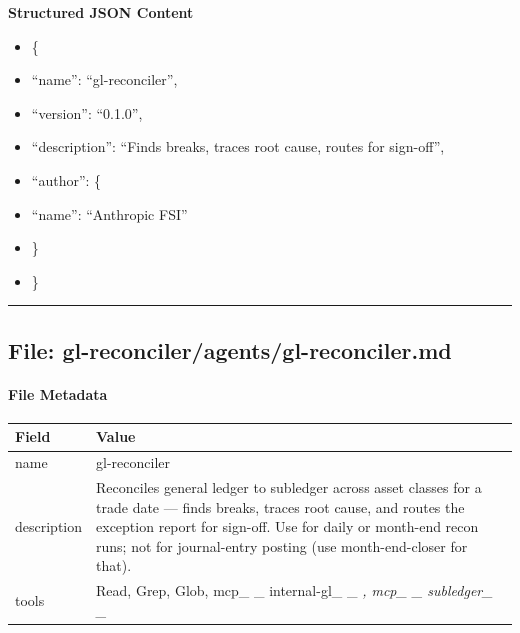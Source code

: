 \documentclass[11pt]{article}
\begin{document}
\textbf{Structured JSON Content}
\begin{itemize}[leftmargin=*,itemsep=2pt,topsep=2pt]
\item {} \{
\item {} ``name'': ``gl-reconciler'',
\item {} ``version'': ``0.1.0'',
\item {} ``description'': ``Finds breaks, traces root cause, routes for sign-off'',
\item {} ``author'': \{
\item {} ``name'': ``Anthropic FSI''
\item {} \}
\item {} \}
\end{itemize}

\vspace{0.8em}\hrule\vspace{0.8em}

\subsection{File: gl-reconciler/agents/gl-reconciler.md}\label{file:gl-reconciler-agents-gl-reconciler-md}

\paragraph{File Metadata}\mbox{}\par
\begingroup
\small
\setlength{\tabcolsep}{2pt}
\begin{longtable}{>{\RaggedRight\arraybackslash\hspace{0pt}}p{}>{\RaggedRight\arraybackslash\hspace{0pt}}p{}}
\toprule
{} \textbf{Field} & \textbf{Value} \\
\midrule
{} name & gl-reconciler \\
{} description & Reconciles general ledger to subledger across asset classes for a trade date — finds breaks, traces root cause, and routes the exception report for sign-off. Use for daily or month-end recon runs; not for journal-entry posting (use month-end-closer for that). \\
{} tools & Read, Grep, Glob, mcp\_\allowbreak{} \_\allowbreak{} internal-gl\_\allowbreak{} \_\allowbreak{} \emph{, mcp\_\allowbreak{} \_\allowbreak{} subledger\_\allowbreak{} \_\allowbreak{} } \\
\bottomrule
\end{longtable}
\endgroup
\end{document}
